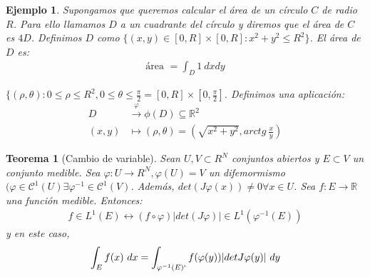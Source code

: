 \documentclass[11pt, a4paper]{article}
\newif\IfInSansMode
\let\oldsf\sffamily
\renewcommand*{\sffamily}{\oldsf\mathversion{sans}\InSansModetrue}
\newcommand{\R}{\mathbb{R}} \newcommand{\N}{\mathbb{N}}
\theoremstyle{theorem-style}
\newtheorem{nth}{Teorema}[section]
\theoremstyle{definition-style}
\theoremstyle{remark-style}
\theoremstyle{example-style}
\newtheorem{ejemplo}{Ejemplo}[section]
\begin{document}
\begin{ejemplo} \hfill

\begin{minipage}[b]{0.55\textwidth}
  Supongamos que queremos calcular el área de un círculo $C$ de radio $R$. Para ello
  llamamos $D$ a un cuadrante del círculo y diremos que el área de $C$ es
  $4D$. Definimos $D$ como $\{ (x, y) \in [0, R] \times [0, R] : x^2 + y^2 \leq
  R^2 \}$. El área de $D$ es:
  \begin{align*}
    \text{área } = \int_D 1 \ dxdy 
  \end{align*}
\end{minipage} \hfill
\begin{minipage}[b]{0.35\textwidth}
\end{minipage}

  $\{ (\rho, \theta) : 0 \leq \rho \leq R^2, 0 \leq \theta \leq
  \frac{\pi}{2} = [0, R] \times [0, \frac{\pi}{2}]$. Definimos una aplicación:
  \begin{align*}
    D &\overset{\varphi}{\longrightarrow} \phi(D) \subseteq \R^2 \\
    (x,y) &\longmapsto (\rho, \theta) = \left(\sqrt{x^2+y^2}, arctg \ \frac{x}{y} \right)
  \end{align*}
\end{ejemplo}

\begin{nth}[Cambio de variable]
  Sean $U, V \subset R^N$ conjuntos abiertos y $E \subset V$ un conjunto medible. Sea $\varphi : U \rightarrow R^N, \varphi(U)
  = V$ un difemormismo $(\varphi \in \mathcal C^1 (U) \exists \varphi^{-1} \in
  \mathcal C^1 (V)$. Además, $det(J \varphi (x)) \neq 0 \forall x \in U$. Sea $f
  : E \rightarrow \R$ una función medible. Entonces:
  \begin{align*}
    f \in L^1(E) \leftrightarrow (f \circ \varphi) |det (J\varphi)| \in L^1(\varphi^{-1}(E))
  \end{align*}
y en este caso,
\begin{align*}
  \int_E f(x) \ dx = \int_{\varphi^{-1}(E)`} f (\varphi(y)) |det J \varphi (y)| \ dy
\end{align*}
\end{nth}
\end{document}
